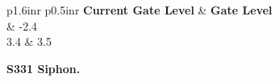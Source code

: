 \footnotesize
\begin{table}[!h]
\centering
\caption{Control strategy for S173 open (Units are ft. NGVD29)}
\label{tab:CS-S173ops-open}
\begin{tabular}{p{1.6in}{r} p{0.5in}{r}}
\hline
\textbf{Current Gate Level} & \textbf{Gate Level}\\
	& -2.4       \\
3.4	& 3.5   \\
\hline
\end{tabular}
\end{table}
\normalsize


\textbf{S331 Siphon.}

%

